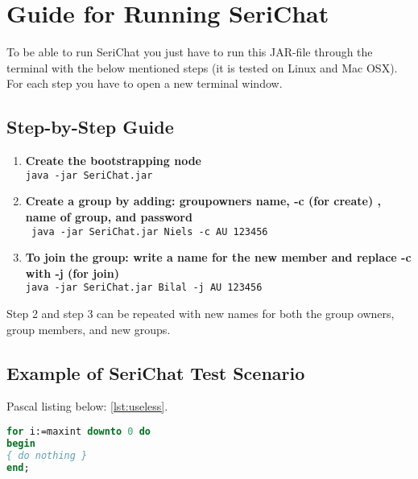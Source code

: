 \chapter{Guide for Running SeriChat}
To be able to run SeriChat you just have to run this JAR-file through the terminal with the below mentioned steps (it is tested on Linux and Mac OSX).
For each step you have to open a new terminal window.

\section{Step-by-Step Guide}
\begin{enumerate}
	\item \textbf{Create the bootstrapping node} 
				\\\texttt{java -jar SeriChat.jar}
	\item \textbf{Create a group by adding: groupowners name, -c (for create) , name of group, and password}
		\\\texttt{ java -jar SeriChat.jar Niels -c AU 123456}
		
	\item \textbf{To join the group: write a name for the new member and replace -c with -j (for join) }
	\\\texttt{java -jar SeriChat.jar Bilal -j AU 123456}
\end{enumerate}

Step 2 and step 3 can be repeated with new names for both the group owners, group members, and new groups.

\section{Example of SeriChat Test Scenario}
Pascal listing below: \autoref{lst:useless}.
\begin{lstlisting}[language=Pascal,frame=tb,caption={A floating example (\texttt{listings} manual)},label=lst:useless]
for i:=maxint downto 0 do
begin
{ do nothing }
end;
\end{lstlisting}